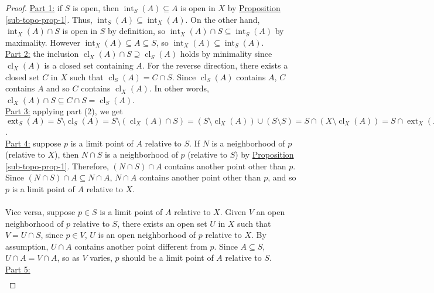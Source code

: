 \documentclass{treatise}
\begin{document}
\begin{proof}
\underline{Part 1:} if $S$ is open, then $\operatorname{int}_S (A) \subseteq A$ is open in $X$ by \hyperref[sub-topo-prop-1]{Proposition \ref*{sub-topo-prop-1}}. Thus, $\operatorname{int}_S (A) \subseteq \operatorname{int}_X (A)$. On the other hand, $\operatorname{int}_X (A) \cap S$ is open in $S$ by definition, so $\operatorname{int}_X (A) \cap S \subseteq \operatorname{int}_S (A)$ by maximality. However $\operatorname{int}_X (A) \subseteq A \subseteq S$, so $\operatorname{int}_X (A) \subseteq \operatorname{int}_S (A)$.
\\
\underline{Part 2:} the inclusion $\operatorname{cl}_X (A) \cap S \supseteq \operatorname{cl}_S (A)$ holds by minimality since $\operatorname{cl}_X (A)$ is a closed set containing $A$. For the reverse direction, there exists a closed set $C$ in $X$ such that $\operatorname{cl}_S(A) = C \cap S$. Since $\operatorname{cl}_S(A)$ contains $A$, $C$ contains $A$ and so $C$ contains $\operatorname{cl}_X (A)$. In other words, $\operatorname{cl}_X (A) \cap S \subseteq C \cap S = \operatorname{cl}_S(A)$.
\\
\underline{Part 3:} applying part (2), we get $\operatorname{ext}_S (A) = S \setminus \operatorname{cl}_S (A) = S \setminus (\operatorname{cl}_X (A) \cap S) = (S \setminus \operatorname{cl}_X (A)) \cup (S \setminus S) = S \cap (X \setminus \operatorname{cl}_X (A)) = S \cap \operatorname{ext}_X (A)$.
\\
\underline{Part 4:} suppose $p$ is a limit point of $A$ relative to $S$. If $N$ is a neighborhood of $p$ (relative to $X$), then $N \cap S$ is a neighborhood of $p$ (relative to $S$) by \hyperref[sub-topo-prop-1]{Proposition \ref*{sub-topo-prop-1}}. Therefore, $(N \cap S) \cap A$ contains another point other than $p$. Since $(N \cap S) \cap A \subseteq N \cap A$, $N \cap A$ contains another point other than $p$, and so $p$ is a limit point of $A$ relative to $X$.
\\
\\
Vice versa, suppose $p \in S$ is a limit point of $A$ relative to $X$. Given $V$ an open neighborhood of $p$ relative to $S$, there exists an open set $U$ in $X$ such that $V = U \cap S$, since $p \in V$, $U$ is an open neighborhood of $p$ relative to $X$. By assumption, $U \cap A$ contains another point different from $p$. Since $A \subseteq S$, $U \cap A = V \cap A$, so as $V$ varies, $p$ should be a limit point of $A$ relative to $S$.
\\
\underline{Part 5:}
\begin{align*}

\end{align*}
\end{proof}
\end{document}
